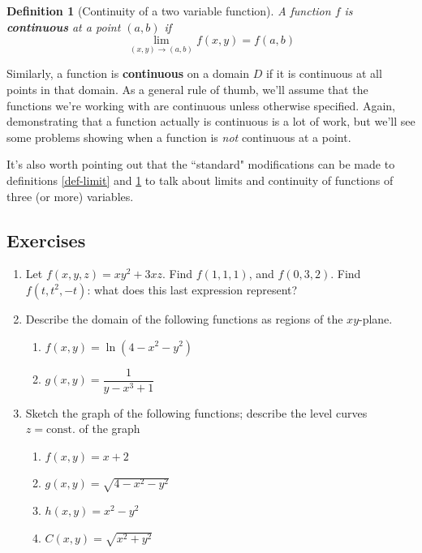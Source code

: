 \documentclass[12pt]{article}
\numberwithin{equation}{subsection}
\numberwithin{figure}{subsection}
\newtheorem{defn}[subsection]{Definition}
\theoremstyle{note}
\begin{document}
{\begin{defn}[Continuity of a two variable function] \label{def-cont}
	A function $f$ is \textbf{continuous} at a point $(a,b)$ if \begin{equation} \lim_{(x,y)\to (a,b)} f(x,y) = f(a,b)\end{equation}
\end{defn}
Similarly, a function is \textbf{continuous} on a domain $D$ if it is continuous at all points in that domain. As a general rule of thumb, we'll assume that the functions we're working with are continuous unless otherwise specified. Again, demonstrating that a function actually is continuous is a lot of work, but we'll see some problems showing when a function is \textit{not} continuous at a point. 

It's also worth pointing out that the ``standard" modifications can be made to definitions \ref{def-limit} and \ref{def-cont} to talk about limits and continuity of functions of three (or more) variables. 



\subsection{Exercises} 
\begin{enumerate}[label=\arabic*.]

\item Let $f(x,y,z)=xy^2+3xz$. Find $f(1,1,1)$, and $f(0,3,2)$. Find $f(t,t^2,-t)$: what does this last expression represent?

\item Describe the domain of the following functions as regions of the $xy$-plane.
\begin{enumerate}
	\item $f(x,y)=\ln(4-x^2-y^2)$
	\item $g(x,y)=\dfrac{1}{y-x^3+1}$
\end{enumerate}

\item Sketch the graph of the following functions; describe the level curves $z=\text{const.}$ of the graph

\begin{enumerate}
	\item $f(x,y)=x+2$
	\item $g(x,y)=\sqrt{4-x^2-y^2}$
	\item $h(x,y)=x^2-y^2$
	\item $C(x,y)=\sqrt{x^2+y^2}$
\end{enumerate}


\end{enumerate}}
\end{document}
